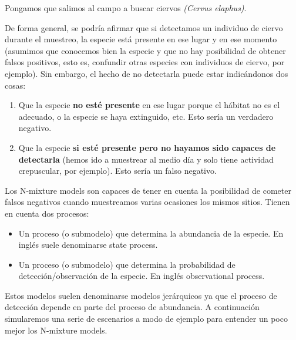 \documentclass[
]{book}
\providecommand{\tightlist}{%
  \setlength{\itemsep}{0pt}\setlength{\parskip}{0pt}}
\begin{document}
\begin{col}{0.45\textwidth}
Pongamos que salimos al campo a buscar ciervos \emph{(Cervus elaphus)}.

De forma general, se podría afirmar que si detectamos un individuo de ciervo durante el muestreo, la especie está presente en ese lugar y en ese momento (asumimos que conocemos bien la especie y que no hay posibilidad de obtener falsos positivos, esto es, confundir otras especies con individuos de ciervo, por ejemplo). Sin embargo, el hecho de no detectarla puede estar indicándonos dos cosas:

\begin{enumerate}
\def\labelenumi{\arabic{enumi}.}
\item
  Que la especie \textbf{no esté presente} en ese lugar porque el hábitat no es el adecuado, o la especie se haya extinguido, etc. Esto sería un verdadero negativo.
\item
  Que la especie \textbf{si esté presente pero no hayamos sido capaces de detectarla} (hemos ido a muestrear al medio día y solo tiene actividad crepuscular, por ejemplo). Esto sería un falso negativo.
\end{enumerate}

Los N-mixture models son capaces de tener en cuenta la posibilidad de cometer falsos negativos cuando muestreamos varias ocasiones los mismos sitios. Tienen en cuenta dos procesos:

\begin{itemize}
\tightlist
\item
  Un proceso (o submodelo) que determina la abundancia de la especie. En inglés suele denominarse state process.
\item
  Un proceso (o submodelo) que determina la probabilidad de detección/observación de la especie. En inglés observational process.
\end{itemize}

Estos modelos suelen denominarse modelos jerárquicos ya que el proceso de detección depende en parte del proceso de abundancia. A continuación simularemos una serie de escenarios a modo de ejemplo para entender un poco mejor los N-mixture models.

\end{col}

\begin{col}{0.05\textwidth}
~

\end{col}
\end{document}
